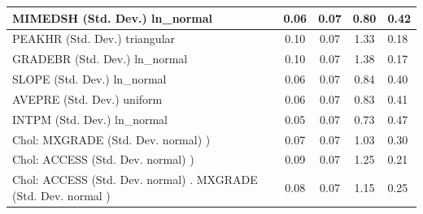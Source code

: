 \begin{table}
\begin{center}
\begin{tabular}{|l|l|c|c|c|l|}
			\hline
			MIMEDSH (Std. Dev.) ln_normal &  & 0.06 & 0.07 & 0.80 & 0.42 \\
			\hline
			PEAKHR (Std. Dev.) triangular &  & 0.10 & 0.07 & 1.33 & 0.18 \\
			\hline
			GRADEBR (Std. Dev.) ln_normal &  & 0.10 & 0.07 & 1.38 & 0.17 \\
			\hline
			SLOPE (Std. Dev.) ln_normal &  & 0.06 & 0.07 & 0.84 & 0.40 \\
			\hline
			AVEPRE (Std. Dev.) uniform &  & 0.06 & 0.07 & 0.83 & 0.41 \\
			\hline
			INTPM (Std. Dev.) ln_normal &  & 0.05 & 0.07 & 0.73 & 0.47 \\
			\hline
			 Chol: MXGRADE (Std. Dev. normal) ) &  & 0.07 & 0.07 & 1.03 & 0.30 \\
			\hline
			 Chol: ACCESS (Std. Dev. normal) ) &  & 0.09 & 0.07 & 1.25 & 0.21 \\
			\hline
			 Chol: ACCESS (Std. Dev. normal) . MXGRADE (Std. Dev.   normal ) &  & 0.08 & 0.07 & 1.15 & 0.25 \\
			\hline
		\end{tabular}
	\end{center}
\end{table}